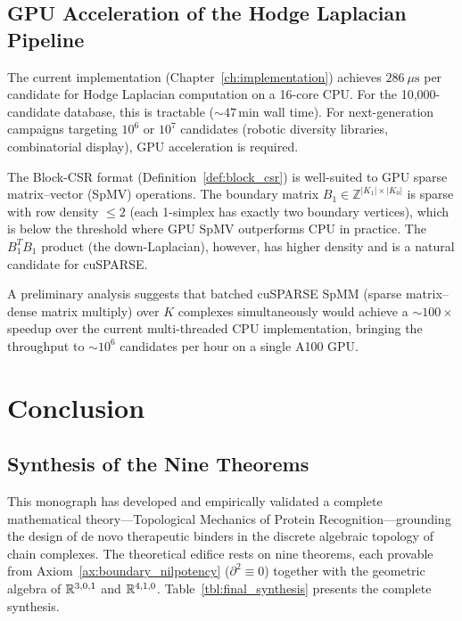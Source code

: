 \subsection{GPU Acceleration of the Hodge Laplacian Pipeline}
\label{subsec:gpu_acceleration}

The current implementation (Chapter~\ref{ch:implementation}) achieves
$286~\mu\mathrm{s}$ per candidate for Hodge Laplacian computation on a
16-core CPU.  For the 10,000-candidate database, this is tractable
($\sim 47\,\mathrm{min}$ wall time).  For next-generation campaigns targeting
$10^6$ or $10^7$ candidates (robotic diversity libraries, combinatorial
display), GPU acceleration is required.

The Block-CSR format (Definition~\ref{def:block_csr}) is well-suited to GPU
sparse matrix--vector (SpMV) operations.  The boundary matrix $B_1 \in
\mathbb{Z}^{|K_1| \times |K_0|}$ is sparse with row density $\le 2$ (each
1-simplex has exactly two boundary vertices), which is below the threshold
where GPU SpMV outperforms CPU in practice.  The $B_1^T B_1$ product (the
down-Laplacian), however, has higher density and is a natural candidate for
cuSPARSE.

A preliminary analysis suggests that batched cuSPARSE SpMM (sparse matrix--
dense matrix multiply) over $K$ complexes simultaneously would achieve a
$\sim 100\times$ speedup over the current multi-threaded CPU implementation,
bringing the throughput to $\sim 10^6$ candidates per hour on a single A100 GPU.

\section{Conclusion}
\label{sec:conclusion}

\subsection{Synthesis of the Nine Theorems}
\label{subsec:theorem_synthesis}

This monograph has developed and empirically validated a complete mathematical
theory---Topological Mechanics of Protein Recognition---grounding the design
of de novo therapeutic binders in the discrete algebraic topology of chain
complexes.  The theoretical edifice rests on nine theorems, each provable from
Axiom~\ref{ax:boundary_nilpotency} ($\partial^2 \equiv 0$) together with
the geometric algebra of $\mathbb{R}^{3,0,1}$ and $\mathbb{R}^{4,1,0}$.
Table~\ref{tbl:final_synthesis} presents the complete synthesis.

